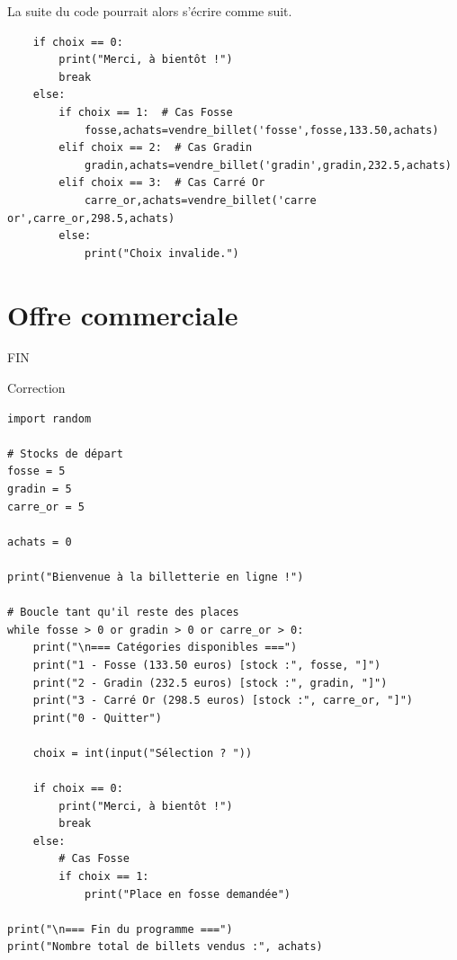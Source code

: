 La suite du code pourrait alors s'écrire comme suit.
\begin{verbatim}
    if choix == 0:
        print("Merci, à bientôt !")
        break
    else:
        if choix == 1:  # Cas Fosse
            fosse,achats=vendre_billet('fosse',fosse,133.50,achats)
        elif choix == 2:  # Cas Gradin
            gradin,achats=vendre_billet('gradin',gradin,232.5,achats)
        elif choix == 3:  # Cas Carré Or
            carre_or,achats=vendre_billet('carre or',carre_or,298.5,achats)
        else:
            print("Choix invalide.")
\end{verbatim}


\section{Offre commerciale}


\begin{center}
\Large{FIN}
\end{center}

\cleardoublepage

\ifdef{\public}{}{\pagestyle{correction}}

\begin{center}
\Large{Correction}
\end{center}

\reponse{}

\begin{verbatim}
import random

# Stocks de départ
fosse = 5
gradin = 5
carre_or = 5

achats = 0

print("Bienvenue à la billetterie en ligne !")

# Boucle tant qu'il reste des places
while fosse > 0 or gradin > 0 or carre_or > 0:
    print("\n=== Catégories disponibles ===")
    print("1 - Fosse (133.50 euros) [stock :", fosse, "]")
    print("2 - Gradin (232.5 euros) [stock :", gradin, "]")
    print("3 - Carré Or (298.5 euros) [stock :", carre_or, "]")
    print("0 - Quitter")

    choix = int(input("Sélection ? "))

    if choix == 0:
        print("Merci, à bientôt !")
        break
    else:
        # Cas Fosse
        if choix == 1:
            print("Place en fosse demandée")

print("\n=== Fin du programme ===")
print("Nombre total de billets vendus :", achats)
\end{verbatim}

